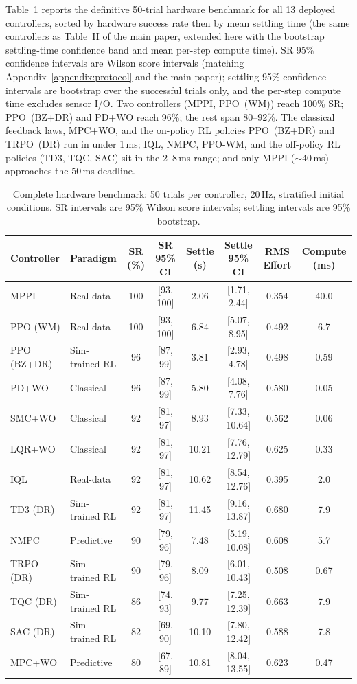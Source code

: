 Table~\ref{tab:full_results} reports the definitive 50-trial hardware
benchmark for all 13 deployed controllers, sorted by hardware success
rate then by mean settling time (the same controllers as Table~II of the main
paper, extended here with the bootstrap settling-time confidence band and
mean per-step compute time). SR 95\% confidence intervals are Wilson
score intervals (matching Appendix~\ref{appendix:protocol} and the main paper);
settling 95\% confidence intervals are bootstrap over the successful
trials only, and the per-step compute time excludes sensor I/O. Two controllers (MPPI, PPO~(WM)) reach
100\% SR; PPO~(BZ+DR) and PD+WO reach 96\%; the rest span
80--92\%. The classical feedback laws, MPC+WO, and the on-policy RL policies PPO~(BZ+DR) and TRPO~(DR) run in under 1\,ms; IQL, NMPC, PPO-WM, and the off-policy RL policies
(TD3, TQC, SAC) sit in the 2--8\,ms range; and only MPPI ($\sim$40\,ms)
approaches the 50\,ms deadline.

\begin{table}[t]
\centering
\caption{Complete hardware benchmark: 50 trials per controller, 20\,Hz,
stratified initial conditions. SR intervals are 95\% Wilson score intervals; settling intervals are 95\% bootstrap.}
\label{tab:full_results}
\begin{tabular}{llcccccc}
\toprule
\textbf{Controller} & \textbf{Paradigm} & \textbf{SR (\%)} & \textbf{SR 95\% CI}
  & \textbf{Settle (s)} & \textbf{Settle 95\% CI} & \textbf{RMS Effort}
  & \textbf{Compute (ms)} \\
\midrule
MPPI & Real-data & 100 & [93, 100] & 2.06 & [1.71, 2.44] & 0.354 & 40.0 \\
PPO (WM) & Real-data & 100 & [93, 100] & 6.84 & [5.07, 8.95] & 0.492 & 6.7 \\
PPO (BZ+DR) & Sim-trained RL & 96 & [87, 99] & 3.81 & [2.93, 4.78] & 0.498 & 0.59 \\
PD+WO & Classical & 96 & [87, 99] & 5.80 & [4.08, 7.76] & 0.580 & 0.05 \\
SMC+WO & Classical & 92 & [81, 97] & 8.93 & [7.33, 10.64] & 0.562 & 0.06 \\
LQR+WO & Classical & 92 & [81, 97] & 10.21 & [7.76, 12.79] & 0.625 & 0.33 \\
IQL & Real-data & 92 & [81, 97] & 10.62 & [8.54, 12.76] & 0.395 & 2.0 \\
TD3 (DR) & Sim-trained RL & 92 & [81, 97] & 11.45 & [9.16, 13.87] & 0.680 & 7.9 \\
NMPC & Predictive & 90 & [79, 96] & 7.48 & [5.19, 10.08] & 0.608 & 5.7 \\
TRPO (DR) & Sim-trained RL & 90 & [79, 96] & 8.09 & [6.01, 10.43] & 0.508 & 0.67 \\
TQC (DR) & Sim-trained RL & 86 & [74, 93] & 9.77 & [7.25, 12.39] & 0.663 & 7.9 \\
SAC (DR) & Sim-trained RL & 82 & [69, 90] & 10.10 & [7.80, 12.42] & 0.588 & 7.8 \\
MPC+WO & Predictive & 80 & [67, 89] & 10.81 & [8.04, 13.55] & 0.623 & 0.47 \\
\bottomrule
\end{tabular}
\end{table}

